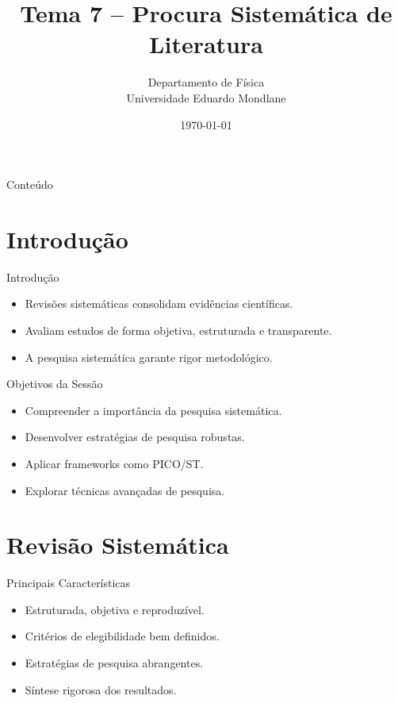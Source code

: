 \documentclass[aspectratio=169]{beamer}
\title[Tema 7]{Tema 7 – Procura Sistemática de Literatura}
\author{Departamento de Física \\ Universidade Eduardo Mondlane}
\date{\today}
\begin{document}
\begin{frame}
\titlepage
\end{frame}

\begin{frame}{Conteúdo}
\tableofcontents
\end{frame}

\section{Introdução}

\begin{frame}{Introdução}
\begin{itemize}
    \item Revisões sistemáticas consolidam evidências científicas.
    \item Avaliam estudos de forma objetiva, estruturada e transparente.
    \item A pesquisa sistemática garante rigor metodológico.
\end{itemize}
\end{frame}

\begin{frame}{Objetivos da Sessão}
\begin{itemize}
    \item Compreender a importância da pesquisa sistemática.
    \item Desenvolver estratégias de pesquisa robustas.
    \item Aplicar frameworks como PICO/ST.
    \item Explorar técnicas avançadas de pesquisa.
\end{itemize}
\end{frame}

\section{Revisão Sistemática}

\begin{frame}{Principais Características}
\begin{itemize}
    \item Estruturada, objetiva e reproduzível.
    \item Critérios de elegibilidade bem definidos.
    \item Estratégias de pesquisa abrangentes.
    \item Síntese rigorosa dos resultados.
\end{itemize}
\end{frame}
\end{document}
